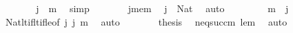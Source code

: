 \begin{isabellebody}
\ \ \ \ \isamarkupfalse%
\ \isamarkupfalse%
\ {\isachardoublequoteopen}j\ {\isasymle}\ m{\isachardoublequoteclose}\ \isamarkupfalse%
\ simp\isanewline
\ \ \ \ \isamarkupfalse%
\ \isamarkupfalse%
\ j{\isacharunderscore}{\kern0pt}mem\ \isamarkupfalse%
\ {\isachardoublequoteopen}j\ {\isacharcolon}{\kern0pt}\ Nat{\isachardoublequoteclose}\ \isamarkupfalse%
\ auto\isanewline
\ \ \ \ \isamarkupfalse%
\ \isamarkupfalse%
\ {\isachardoublequoteopen}{\isasymnot}\ m\ {\isacharless}{\kern0pt}\ j{\isachardoublequoteclose}\ \isamarkupfalse%
\ Nat{\isacharunderscore}{\kern0pt}lt{\isacharunderscore}{\kern0pt}if{\isacharunderscore}{\kern0pt}lt{\isacharunderscore}{\kern0pt}if{\isacharunderscore}{\kern0pt}le{\isacharbrackleft}{\kern0pt}of\ j\ j\ m{\isacharbrackright}{\kern0pt}\ \isamarkupfalse%
\ auto\isanewline
\ \ \ \ \isamarkupfalse%
\ \isamarkupfalse%
\ {\isacharquery}{\kern0pt}thesis\ \isamarkupfalse%
\ n{\isacharunderscore}{\kern0pt}eq{\isacharunderscore}{\kern0pt}succ{\isacharunderscore}{\kern0pt}m\ lem\ \isamarkupfalse%
\ auto\isanewline
\ \ \isamarkupfalse%
\isanewline
\ \ \isanewline
{}\isamarkupfalse%
%
\endisatagproof
{\isafoldproof}%
%
\isadelimproof
\isanewline
%
\endisadelimproof
%
\isadelimtheory
\isanewline
%
\endisadelimtheory
%
\isatagtheory
{}\isamarkupfalse%
%
\endisatagtheory
{\isafoldtheory}%
%
\isadelimtheory
%
\endisadelimtheory
%
\end{isabellebody}%
\endinput
